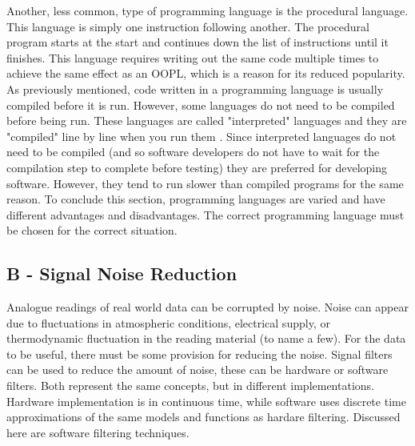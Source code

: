 \documentclass[twoside,a4]{report}
\def\br{\newline \newline \noindent}
\begin{document}
Another, less common, type of programming language is the procedural language. This language is simply one instruction following another\cite{proglangwhatisoopl}. The procedural program starts at the start and continues down the list of instructions until it finishes. This language requires writing out the same code multiple times to achieve the same effect as an OOPL, which is a reason for its reduced popularity. \br
As previously mentioned, code written in a programming language is usually compiled before it is run. However, some languages do not need to be compiled before being run. These languages are called "interpreted" languages and they are "compiled" line by line when you run them \cite{proglanginterp}. Since interpreted languages do not need to be compiled (and so software developers do not have to wait for the compilation step to complete before testing) they are preferred for developing software. However, they tend to run slower than compiled programs for the same reason. \br
To conclude this section,  programming languages are varied and have different advantages and disadvantages. The correct programming language must be chosen for the correct situation.

\subsection{B -  Signal Noise Reduction}
Analogue readings of real world data can be corrupted by noise. Noise can appear due to fluctuations in atmospheric conditions, electrical supply, or thermodynamic fluctuation in the reading material (to name a few). For the data to be useful, there must be some provision for reducing the noise. Signal filters can be used to reduce the amount of noise, these can be hardware or software filters. Both represent the same concepts, but in different implementations. Hardware implementation is in continuous time, while software uses discrete time approximations of the same models and functions as hardare filtering. Discussed here are software filtering techniques. \br

\end{document}

